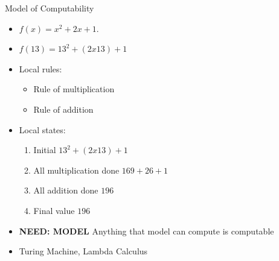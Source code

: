 \documentclass[usenames,dvipsnames]{beamer}
\begin{document}
\begin{frame}{Model of Computability}
    \begin{itemize}
        \item $f(x) = x^2 + 2x +1$. 
        \item $f(13) = 13^2 + (2x13) + 1$
        \item Local rules:
                \begin{itemize}
                    \item Rule of multiplication
                    \item Rule of addition
                \end{itemize} 
        \item Local states:
                \begin{enumerate}
                    \item Initial $13^2 + (2x13) + 1$
                    \item All multiplication done $169 + 26 + 1$
                    \item All addition done $196$
                    \item Final value $196$
                \end{enumerate}
        \item \textbf{NEED: MODEL} Anything that model can compute is computable
        \item Turing Machine, Lambda Calculus 
    \end{itemize}
\end{frame}
\end{document}
